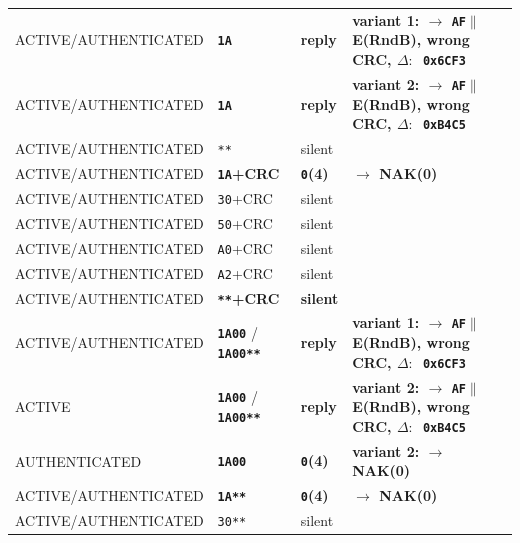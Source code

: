 \begin{longtable}{l l l l}
ACTIVE/AUTHENTICATED & \textbf{\texttt{1A}}                & \textbf{reply}  & \textbf{variant 1: $\rightarrow$ 
 \texttt{AF}$\|$E(RndB), wrong CRC, $\Delta:$~\texttt{0x6CF3}}              \\
ACTIVE/AUTHENTICATED & \textbf{\texttt{1A}}                & \textbf{reply}  & \textbf{variant 2: $\rightarrow$ 
 \texttt{AF}$\|$E(RndB), wrong CRC, $\Delta:$~\texttt{0xB4C5}}              \\
ACTIVE/AUTHENTICATED & \texttt{**}                         & silent          &                                             \\
ACTIVE/AUTHENTICATED          & \textbf{\texttt{1A}+CRC}            & \textbf{\texttt{0}(4)}  & \textbf{$\rightarrow$ NAK(0)}                 \\
ACTIVE/AUTHENTICATED & \texttt{30}+CRC                     & silent          &                                             \\
ACTIVE/AUTHENTICATED & \texttt{50}+CRC                     & silent          &                                             \\
ACTIVE/AUTHENTICATED & \texttt{A0}+CRC                     & silent          &                                             \\
ACTIVE/AUTHENTICATED & \texttt{A2}+CRC                     & silent          &                                             \\
ACTIVE/AUTHENTICATED & \textbf{\texttt{**}+CRC}            & \textbf{silent} &                                             \\
ACTIVE/AUTHENTICATED & \textbf{\texttt{1A00}} / \textbf{\texttt{1A00**}} & \textbf{reply}  & \textbf{variant 1: $\rightarrow$ 
 \texttt{AF}$\|$E(RndB), wrong CRC, $\Delta:$~\texttt{0x6CF3}}              \\
ACTIVE               & \textbf{\texttt{1A00}} / \textbf{\texttt{1A00**}} & \textbf{reply}  & \textbf{variant 2: $\rightarrow$ 
 \texttt{AF}$\|$E(RndB), wrong CRC, $\Delta:$~\texttt{0xB4C5}}              \\
AUTHENTICATED        & \textbf{\texttt{1A00}}              & \textbf{\texttt{0}(4)}  & \textbf{variant 2: $\rightarrow$ 
 NAK(0)}              \\
ACTIVE/AUTHENTICATED & \textbf{\texttt{1A**}}              & \textbf{\texttt{0}(4)}   & \textbf{$\rightarrow$ NAK(0)}               \\
ACTIVE/AUTHENTICATED & \texttt{30**}                       & silent          &                                             \\

\end{longtable}
